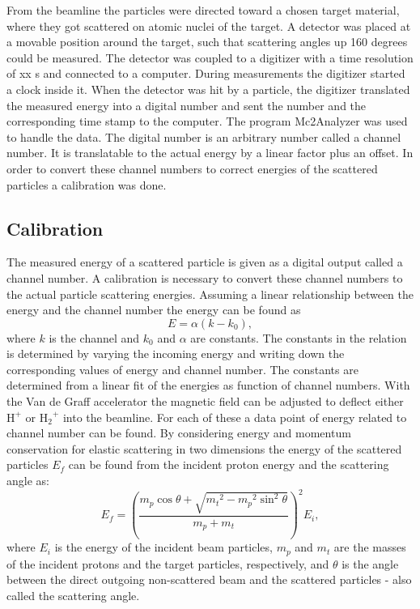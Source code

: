 \documentclass[english,a4paper,twocolumn,amsmath,amssymb,floatfix]{revtex4-1}
\begin{document}
From the beamline the particles were directed toward a chosen target material, where they got scattered on atomic nuclei of the target. A detector was placed at a movable position around the target, such that scattering angles up 160 degrees could be measured. 
The detector was coupled to a digitizer with a time resolution of xx s and  connected to a computer. During measurements the digitizer started a clock inside it. When the detector was hit by a particle, the digitizer translated the measured energy into a digital number and sent the number and the corresponding time stamp to the computer. 
The program Mc2Analyzer was used to handle the data. The digital number is an arbitrary number called a channel number. It is translatable to the actual energy by a linear factor plus an offset. In order to convert these channel numbers to correct energies of the scattered particles a calibration was done.


\subsection*{Calibration}
The measured energy of a scattered particle is given as a digital output called a channel number. A calibration is necessary to convert these channel numbers to the actual particle scattering energies. Assuming a linear relationship between the energy and the channel number the energy can be found as 
\begin{equation}
E = \alpha(k - k_0),
\end{equation}
where $k$ is the channel and $k_0$ and $\alpha$ are constants. The constants in the relation is determined by varying the incoming energy and writing down the corresponding values of energy and channel number. The constants are determined from a linear fit of the energies as function of channel numbers.
With the Van de Graff accelerator the magnetic field can be adjusted to deflect either $\mathrm{H^+}$ or $\mathrm{{H_2}^+}$ into the beamline. For each of these a data point of energy related to channel number can be found. 
By considering energy and momentum conservation for elastic scattering in two dimensions the energy of the scattered particles $E_f$ can be found from the incident proton energy and the scattering angle as: 
\begin{equation}
E_f = \left( \frac{m_p \cos\theta + \sqrt{{m_t}^2 - {m_p}^2 \sin^2\theta}}{m_p+m_t} \right)^2 E_i,
\end{equation}
where $E_i$ is the energy of the incident beam particles, $m_p$ and $m_t$ are the masses of the incident protons and the target particles, respectively, and $\theta$ is the angle between the direct outgoing non-scattered beam and the scattered particles - also called the scattering angle.
\end{document}
